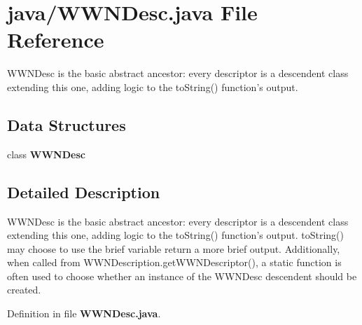 \section{java/\-W\-W\-N\-Desc.java File Reference}
\label{WWNDesc_8java}


W\-W\-N\-Desc is the basic abstract ancestor\-: every descriptor is a descendent class extending this one, adding logic to the to\-String() function's output.  


\subsection*{Data Structures}
\begin{DoxyCompactItemize}
\item 
class {\bf W\-W\-N\-Desc}
\end{DoxyCompactItemize}


\subsection{Detailed Description}
W\-W\-N\-Desc is the basic abstract ancestor\-: every descriptor is a descendent class extending this one, adding logic to the to\-String() function's output. to\-String() may choose to use the brief variable return a more brief output. Additionally, when called from W\-W\-N\-Description.\-get\-W\-W\-N\-Descriptor(), a static function is often used to choose whether an instance of the W\-W\-N\-Desc descendent should be created. 

Definition in file {\bf W\-W\-N\-Desc.\-java}.

